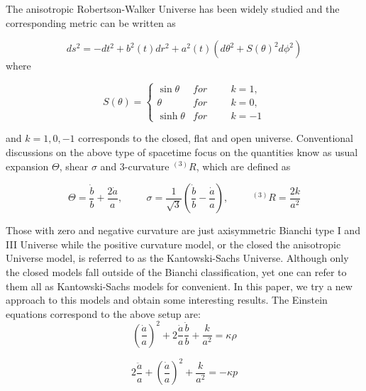 \documentclass[a4paper,preprint]{revtex4}
\begin{document}
The anisotropic Robertson-Walker Universe has been widely studied
\cite{kantowski} and the corresponding metric can be written as

\begin{equation}\label{metric}
ds^2=-dt^2+b^2(t)dr^2+a^2(t)(d\theta^2+S(\theta)^2d\phi^2)
\end{equation}
\noindent where

\begin{equation}\label{s}
 S(\theta)=
  \begin{cases}
    \sin\theta & for \hspace{1cm} k=1, \\
    \theta & for \hspace{1cm} k=0,\\
    \sinh\theta & for \hspace{1cm} k=-1
  \end{cases}
\end{equation}


\noindent and $k=1, 0, -1$ corresponds to the closed, flat and
open universe. Conventional discussions on the above type of
spacetime focus on the quantities know as usual expansion
$\Theta$, shear $\sigma$ and 3-curvature $^{(3)}R$, which are
defined as

\begin{equation}\label{definequantity}
\Theta=\frac{\dot{b}}{b}+\frac{2\dot{a}}{a}, \hspace{1cm}
\sigma=\frac{1}{\sqrt{3}}(\frac{\dot{b}}{b}-\frac{\dot{a}}{a}),
\hspace{1cm} ^{(3)}R=\frac{2k}{a^2}
\end{equation}

Those with zero and negative curvature are just axisymmetric
Bianchi type I and III Universe while the positive curvature
model, or the closed the anisotropic Universe model, is referred
to as the Kantowski-Sachs Universe. Although only the closed
models fall outside of the Bianchi classification, yet one can
refer to them all as Kantowski-Sachs models for
convenient\cite{barrow}. In this paper, we try a new approach to
this models and obtain some interesting results. The Einstein
equations correspond to the above setup are:
\begin{equation}\label{einstein1}
(\frac{\dot{a}}{a})^2+2\frac{\dot{a}}{a}\frac{\dot{b}}{b}+\frac{k}{a^2}=\kappa\rho
\end{equation}

\begin{equation}\label{einstein2}
 2\frac{\ddot{a}}{a}+(\frac{\dot{a}}{a})^2+\frac{k}{a^2}=-\kappa p
\end{equation}
\end{document}
